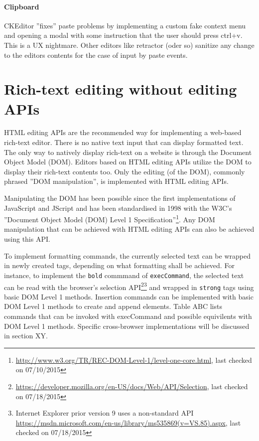 \paragraph{Clipboard} CKEditor ''fixes'' paste problems by implementing a custom fake context menu and opening a modal with some instruction that the user should press ctrl+v. This is a UX nightmare. Other editors like retractor (oder so) sanitize any change to the editors contents for the case of input by paste events.

\section{Rich-text editing without editing APIs}

HTML editing APIs are the recommended way for implementing a web-based rich-text editor. There is no native text input that can display formatted text. The only way to natively display rich-text on a website is through the Document Object Model (DOM). Editors based on HTML editing APIs utilize the DOM to display their rich-text contents too. Only the editing (of the DOM), commonly phrased ''DOM manipulation'', is implemented with HTML editing APIs.

Manipulating the DOM has been possible since the first implementations of JavaScript and JScript and has been standardised in 1998 with the W3C's ''Document Object Model (DOM) Level 1 Specification''\footnote{\url{http://www.w3.org/TR/REC-DOM-Level-1/level-one-core.html}, last checked on 07/10/2015}. Any DOM manipulation that can be achieved with HTML editing APIs can also be achieved using this API.

To implement formatting commands, the currently selected text can be wrapped in newly created tags, depending on what formatting shall be achieved. For instance, to implement the \texttt{bold} commmand of \texttt{execCommand}, the selected text can be read with the browser's selection API\footnote{\url{https://developer.mozilla.org/en-US/docs/Web/API/Selection}, last checked on 07/18/2015}\footnote{Internet Explorer prior version 9 uses a non-standard API \url{https://msdn.microsoft.com/en-us/library/ms535869(v=VS.85).aspx}, last checked on 07/18/2015} and wrapped in \texttt{strong} tags using basic DOM Level 1 methods. Insertion commands can be implemented with basic DOM Level 1 methods to create and append elements. Table ABC lists commands that can be invoked with execCommand and possible equivilents with DOM Level 1 methods. Specific cross-browser implementations will be discussed in section XY.

